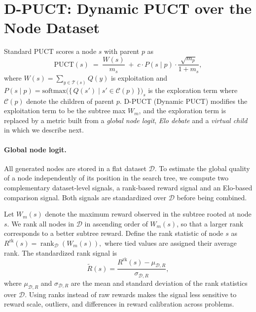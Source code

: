 \documentclass{article} %
\newcommand{\dpuct}{\textsc{D-PUCT}}
\newcommand{\Tree}[1]{\mathcal{T}(#1)}
\newcommand{\Ch}[1]{\mathcal{C}(#1)}
\begin{document}
\section{\dpuct: Dynamic PUCT over the Node Dataset}
\label{sec:dpuct}

Standard PUCT scores a node $s$ with parent $p$ as
\begin{equation*}
\mathrm{PUCT}(s) \;=\; {\frac{W(s)}{m_s}} \;+\; c \cdot P(s \mid p) \cdot {\frac{\sqrt{m_p}}{1 + m_s}},
\end{equation*}
where $W(s) = \sum_{y \in \Tree{s}} Q(y)$ is exploitation and $P(s \mid p) = \mathrm{softmax}\big(\{\, Q(s') \mid s' \in \Ch{p} \,\}\big)_s$ is the exploration term where 
$\Ch{p}$ denote the children of parent $p$.
\dpuct{} (Dynamic PUCT) modifies the exploitation term to be the subtree max $W_m$, and the exploration term is replaced by a metric built from a \emph{global node logit}, \emph{Elo debate} and a \emph{virtual child} in which we describe next.



\paragraph{Global node logit.}
All generated nodes are stored in a flat dataset $\mathcal{D}$. To estimate the
global quality of a node independently of its position in the search tree, we
compute two complementary dataset-level signals, a rank-based reward signal and
an Elo-based comparison signal. Both signals are standardized over
$\mathcal{D}$ before being combined.

Let $W_m(s)$ denote the maximum reward observed in the subtree rooted at node
$s$. We rank all nodes in $\mathcal{D}$ in ascending order of $W_m(s)$, so that
a larger rank corresponds to a better subtree reward. Define the rank statistic
of node $s$ as
$R^{\mathrm{rk}}(s)
=
\operatorname{rank}_{\mathcal{D}}\!\left(W_m(s)\right),$
where tied values are assigned their average rank. The standardized rank signal
is
\begin{equation*}
\widetilde{R}(s)
=
\frac{
R^{\mathrm{rk}}(s)-\mu_{\mathcal{D},R}
}{
\sigma_{\mathcal{D},R}
},
\end{equation*}
where $\mu_{\mathcal{D},R}$ and $\sigma_{\mathcal{D},R}$ are the
mean and standard deviation of the rank statistics over $\mathcal{D}$. Using ranks
instead of raw rewards makes the signal less sensitive to reward scale,
outliers, and differences in reward calibration across problems.
\end{document}
